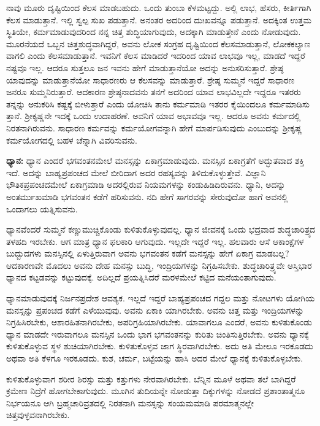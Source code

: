 ನಾವು ಮೂರು ದೃಷ್ಟಿಯಿಂದ ಕೆಲಸ ಮಾಡಬಹುದು. ಒಂದು ತುಂಬಾ ಕೆಳಮಟ್ಟದ್ದು. ಅಲ್ಲಿ ಲಾಭ, ಹೆಸರು, ಕೀರ್ತಿಗಾಗಿ ಕೆಲಸ ಮಾಡುತ್ತಾನೆ. ಇಲ್ಲಿ ಸ್ವಲ್ಪ ಸುಖ ಪಡುತ್ತಾನೆ. ಅನಂತರ ಅದರಿಂದ ದುಃಖವನ್ನೂ ಪಡುತ್ತಾನೆ. ಅದಕ್ಕಿಂತ ಉತ್ತಮ ಸ್ಥಿತಿಯೇ, ಕರ್ಮಮಾಡುವುದರಿಂದ ನನ್ನ ಚಿತ್ತ ಶುದ್ಧಿಯಾಗುವುದು, ಅದಕ್ಕಾಗಿ ಮಾಡುತ್ತೇನೆ ಎಂದು ನೋಡುವುದು. ಮೂರನೆಯದೆ ಒಬ್ಬನ ಚಿತ್ತಶುದ್ಧವಾಗಿದ್ದರೆ, ಅವನು ಲೋಕ ಸಂಗ್ರಹ ದೃಷ್ಟಿಯಿಂದ ಕೆಲಸಮಾಡುತ್ತಾನೆ, ಲೋಕಕಲ್ಯಾಣ ವಾಗಲಿ ಎಂದು ಕೆಲಸಮಾಡುತ್ತಾನೆ. ಇವನಿಗೆ ಕೆಲಸ ಮಾಡಿದರೆ ಇದರಿಂದ ಯಾವ ಲಾಭವೂ ಇಲ್ಲ, ಮಾಡದೆ ಇದ್ದರೆ ನಷ್ಟವೂ ಇಲ್ಲ. ಆದರೂ ಸುತ್ತಲೂ ಜನ ಇವನು ಹೇಗೆ ಮಾಡುತ್ತಾನೆಯೋ ಅದನ್ನು ಅನುಸರಿಸುತ್ತಾರೆ. ಶ್ರೇಷ್ಠ ಯಾವುದನ್ನು ಮಾಡುತ್ತಾನೆಯೋ ಸಾಧಾರಣರು ಆ ಕೆಲಸವನ್ನು ಮಾಡುತ್ತಾರೆ. ಶ್ರೇಷ್ಠ ಸುಮ್ಮನೆ ಇದ್ದರೆ ಸಾಧಾರಣ ಜನರೂ ಸುಮ್ಮನಿರುತ್ತಾರೆ. ಆದಕಾರಣ ಶ್ರೇಷ್ಠನಾದವನು ತನಗೆ ಅದರಿಂದ ಯಾವ ಲಾಭವಿಲ್ಲದೇ ಇದ್ದರೂ ಇತರರು ತನ್ನನ್ನು ಅನುಕರಿಸಿ ಕಷ್ಟಕ್ಕೆ ಬೀಳುತ್ತಾರೆ ಎಂದು ಯೋಚಿಸಿ ತಾನು ಕರ್ಮಮಾಡಿ ಇತರರ ಕೈಯಿಂದಲೂ ಕರ್ಮಮಾಡಿಸು ತ್ತಾನೆ. ಶ್ರೀಕೃಷ್ಣನೇ ಇದಕ್ಕೆ ಒಂದು ಉದಾಹರಣೆ. ಅವನಿಗೆ ಯಾವ ಅಭಾವವೂ ಇಲ್ಲ. ಆದರೂ ಅವನು ಕರ್ಮದಲ್ಲಿ ನಿರತನಾಗಿರುವನು. ಸಾಧಾರಣ ಕರ್ಮವನ್ನು ಕರ್ಮಯೋಗವನ್ನಾಗಿ ಹೇಗೆ ಮಾರ್ಪಡಿಸುವುದು ಎಂಬುದನ್ನು ಶ್ರೀಕೃಷ್ಣ ಕರ್ಮಯೋಗದಲ್ಲಿ ಬಹಳ ಚೆನ್ನಾಗಿ ವಿವರಿಸುವನು.

\textbf{ಧ್ಯಾನ:} ಧ್ಯಾನ ಎಂದರೆ ಭಗವಂತನಮೇಲೆ ಮನಸ್ಸನ್ನು ಏಕಾಗ್ರಮಾಡುವುದು. ಮನಸ್ಸಿನ ಏಕಾಗ್ರತೆಗೆ ಅದ್ಭುತವಾದ ಶಕ್ತಿ ಇದೆ. ಅದನ್ನು ಬಾಹ್ಯಪ್ರಪಂಚದ ಮೇಲೆ ಬೀರಿದಾಗ ಅದರ ರಹಸ್ಯವನ್ನು ತಿಳಿದುಕೊಳ್ಳುತ್ತೇವೆ. ವಿಜ್ಞಾನಿ ಭೌತಿಕಪ್ರಪಂಚದಮೇಲೆ ಏಕಾಗ್ರಮಾಡಿ ಅದರಲ್ಲಿರುವ ನಿಯಮಗಳನ್ನು ಕಂಡುಹಿಡಿದಿರುವನು. ಧ್ಯಾನಿ, ಅದನ್ನು ಅಂತರ್ಮುಖಮಾಡಿ ಭಗವಂತನ ಕಡೆಗೆ ಹರಿಸುವನು. ನದಿ ಹೇಗೆ ಸಾಗರವನ್ನು ಸೇರುವುದೋ ಹಾಗೆ ಅವನಲ್ಲಿ ಒಂದಾಗಲು ಯತ್ನಿಸುವನು.

ಧ್ಯಾನವೆಂದರೆ ಸುಮ್ಮನೆ ಕಣ್ಣುಮುಚ್ಚಿಕೊಂಡು ಕುಳಿತುಕೊಳ್ಳುವುದಲ್ಲ. ಧ್ಯಾನ ಜೀವನಕ್ಕೆ ಒಂದು ಭದ್ರವಾದ ಶುದ್ಧಚಾರಿತ್ರ್ಯದ ತಳಹದಿ ಇರಬೇಕು. ಆಗ ಮಾತ್ರ ಧ್ಯಾನ ಫಲಕಾರಿ ಆಗುವುದು. ಇಲ್ಲದೇ ಇದ್ದರೆ ಇಲ್ಲ. ಹಲವಾರು ಆಸೆ ಆಕಾಂಕ್ಷೆಗಳ ಬುದ್ಬುದಗಳು ಮನಸ್ಸಿನಲ್ಲಿ ಏಳುತ್ತಿರುವಾಗ ಅವನು ಭಗವಂತನ ಕಡೆಗೆ ಮನಸ್ಸನ್ನು ಹೇಗೆ ಏಕಾಗ್ರ ಮಾಡಬಲ್ಲ? ಆದಕಾರಣವೇ ಮೊದಲು ಅವನು ದೇಹ ಮನಸ್ಸು ಬುದ್ಧಿ, ಇಂದ್ರಿಯಗಳನ್ನು ನಿಗ್ರಹಿಸಬೇಕು. ಶುದ್ಧಚಾರಿತ್ರ್ಯವೇ ಅಸ್ತಿಭಾರ ಧ್ಯಾನದ ಕಟ್ಟಡವನ್ನು ಕಟ್ಟುವುದಕ್ಕೆ. ಅದಿಲ್ಲದೆ ಪ್ರಯತ್ನಿಸಿದರೆ ಮರಳಮೇಲೆ ಕಟ್ಟಿದ ಮನೆಯಂತಾಗುವುದು.

ಧ್ಯಾನಮಾಡುವುದಕ್ಕೆ ನಿರ್ಜನಪ್ರದೇಶ ಆವಶ್ಯಕ. ಇಲ್ಲದೆ ಇದ್ದರೆ ಬಾಹ್ಯಪ್ರಪಂಚದ ಗದ್ದಲ ಮತ್ತು ನೋಟಗಳು ಯೋಗಿಯ ಮನಸ್ಸನ್ನು ಪ್ರಪಂಚದ ಕಡೆಗೆ ಎಳೆಯುವುವು. ಅವನು ಏಕಾಕಿ ಯಾಗಿರಬೇಕು. ಅವನು ಚಿತ್ತ ಮತ್ತು ಇಂದ್ರಿಯಗಳನ್ನು ನಿಗ್ರಹಿಸಿರಬೇಕು, ಆಶಾರಹಿತನಾಗಿರಬೇಕು, ಅಪರಿಗ್ರಹಿಯಾಗಿರಬೇಕು. ಯಾವಾಗಲೂ ಎಂದರೆ, ಅವನು ಕುಳಿತುಕೊಂಡು ಧ್ಯಾನ ಮಾಡದೇ ಇರುವಾಗಲೂ ಮನಸ್ಸಿನ ಒಂದು ಭಾಗ ಭಗವಂತನನ್ನು ಕುರಿತು ಚಿಂತಿಸುತ್ತಿರಬೇಕು. ಅವನು ಧ್ಯಾನಕ್ಕೆ ಕುಳಿತುಕೊಳ್ಳುವ ಸ್ಥಳ ಶುಚಿಯಾಗಿರಬೇಕು. ಕುಳಿತುಕೊಳ್ಳವ ಜಾಗ ಸ್ಥಿರವಾಗಿರಬೇಕು. ಅದು ಅತಿ ಮೇಲೂ ಇರಕೂಡದು ಅಥವಾ ಅತಿ ಕೆಳಗೂ ಇರಕೂಡದು. ಕುಶ, ಚರ್ಮ, ಬಟ್ಟೆಯನ್ನು ಹಾಸಿ ಅದರ ಮೇಲೆ ಧ್ಯಾನಕ್ಕೆ ಕುಳಿತುಕೊಳ್ಳಬೇಕು.

ಕುಳಿತುಕೊಳ್ಳುವಾಗ ಶರೀರ ಶಿರಸ್ಸು ಮತ್ತು ಕತ್ತುಗಳು ನೇರವಾಗಿರಬೇಕು. ಬೆನ್ನಿನ ಮೂಳೆ ಅಥವಾ ತಲೆ ಬಾಗಿದ್ದರೆ ಕ್ರಮೇಣ ನಿದ್ರೆಗೆ ಹೋಗಬೇಕಾಗುವುದು. ಮೂಗಿನ ತುದಿಯನ್ನೇ ನೋಡುತ್ತಾ ದಿಕ್ಕುಗಳನ್ನು ನೋಡದೆ ಪ್ರಶಾಂತಾತ್ಮನೂ ನಿರ್ಭಯನೂ ಆಗಿ ಬ್ರಹ್ಮಚಾರಿವ್ರತದಲ್ಲಿ ನಿರತನಾಗಿ ಮನಸ್ಸನ್ನು ಸಂಯಮಮಾಡಿ ಪರಮಾತ್ಮನಲ್ಲೇ ಚಿತ್ತವುಳ್ಳವನಾಗಿರಬೇಕು.

